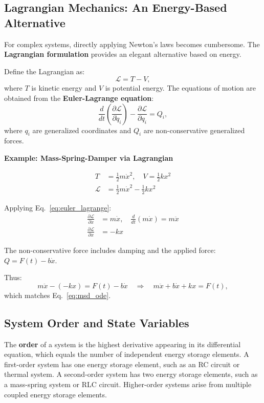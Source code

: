 \subsection{Lagrangian Mechanics: An Energy-Based Alternative}

For complex systems, directly applying Newton's laws becomes cumbersome. The \textbf{Lagrangian formulation} provides an elegant alternative based on energy.

Define the Lagrangian as:
\begin{equation}
\mathcal{L} = T - V,
\end{equation}
where $T$ is kinetic energy and $V$ is potential energy. The equations of motion are obtained from the \textbf{Euler-Lagrange equation}:
\begin{equation}
\frac{d}{dt}\left(\frac{\partial \mathcal{L}}{\partial \dot{q}_i}\right) - \frac{\partial \mathcal{L}}{\partial q_i} = Q_i,
\label{eq:euler_lagrange}
\end{equation}
where $q_i$ are generalized coordinates and $Q_i$ are non-conservative generalized forces.

\textbf{Example: Mass-Spring-Damper via Lagrangian}

\begin{align}
T &= \frac{1}{2}m\dot{x}^2, \quad V = \frac{1}{2}kx^2 \\
\mathcal{L} &= \frac{1}{2}m\dot{x}^2 - \frac{1}{2}kx^2
\end{align}

Applying Eq.~\eqref{eq:euler_lagrange}:
\begin{align}
\frac{\partial \mathcal{L}}{\partial \dot{x}} &= m\dot{x}, \quad \frac{d}{dt}(m\dot{x}) = m\ddot{x} \\
\frac{\partial \mathcal{L}}{\partial x} &= -kx
\end{align}

The non-conservative force includes damping and the applied force: $Q = F(t) - b\dot{x}$.

Thus:
\begin{equation}
m\ddot{x} - (-kx) = F(t) - b\dot{x} \quad \Rightarrow \quad m\ddot{x} + b\dot{x} + kx = F(t),
\end{equation}
which matches Eq.~\eqref{eq:msd_ode}.

\subsection{System Order and State Variables}

The \textbf{order} of a system is the highest derivative appearing in its differential equation, which equals the number of independent energy storage elements. A first-order system has one energy storage element, such as an RC circuit or thermal system. A second-order system has two energy storage elements, such as a mass-spring system or RLC circuit. Higher-order systems arise from multiple coupled energy storage elements.

